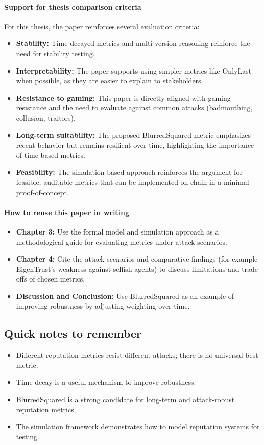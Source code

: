 \documentclass[11pt,a4paper]{article}
\begin{document}
\paragraph{Support for thesis comparison criteria}
For this thesis, the paper reinforces several evaluation criteria:
\begin{itemize}[leftmargin=*]
  \item \textbf{Stability:} Time-decayed metrics and multi-version reasoning reinforce the need for stability testing.
  \item \textbf{Interpretability:} The paper supports using simpler metrics like OnlyLast when possible, as they are easier to explain to stakeholders.
  \item \textbf{Resistance to gaming:} This paper is directly aligned with gaming resistance and the need to evaluate against common attacks (badmouthing, collusion, traitors).
  \item \textbf{Long-term suitability:} The proposed BlurredSquared metric emphasizes recent behavior but remains resilient over time, highlighting the importance of time-based metrics.
  \item \textbf{Feasibility:} The simulation-based approach reinforces the argument for feasible, auditable metrics that can be implemented on-chain in a minimal proof-of-concept.
\end{itemize}

\paragraph{How to reuse this paper in writing}
\begin{itemize}[leftmargin=*]
  \item \textbf{Chapter 3:} Use the formal model and simulation approach as a methodological guide for evaluating metrics under attack scenarios.
  \item \textbf{Chapter 4:} Cite the attack scenarios and comparative findings (for example EigenTrust's weakness against selfish agents) to discuss limitations and trade-offs of chosen metrics.
  \item \textbf{Discussion and Conclusion:} Use BlurredSquared as an example of improving robustness by adjusting weighting over time.
\end{itemize}

\subsection{Quick notes to remember}
\begin{itemize}[leftmargin=*]
  \item Different reputation metrics resist different attacks; there is no universal best metric.
  \item Time decay is a useful mechanism to improve robustness.
  \item BlurredSquared is a strong candidate for long-term and attack-robust reputation metrics.
  \item The simulation framework demonstrates how to model reputation systems for testing.
\end{itemize}
\end{document}
